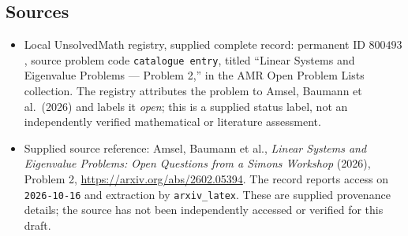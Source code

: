 \documentclass[11pt]{article}
\begin{document}
\subsection{Sources}
\begin{itemize}
\item Local UnsolvedMath registry, supplied complete record: permanent ID \(800493\), source problem code \texttt{catalogue entry}, titled ``Linear Systems and Eigenvalue Problems --- Problem 2,'' in the AMR Open Problem Lists collection. The registry attributes the problem to Amsel, Baumann et al.\ (2026) and labels it \emph{open}; this is a supplied status label, not an independently verified mathematical or literature assessment.
\item Supplied source reference: Amsel, Baumann et al., \emph{Linear Systems and Eigenvalue Problems: Open Questions from a Simons Workshop} (2026), Problem 2, \url{https://arxiv.org/abs/2602.05394}. The record reports access on \texttt{2026-10-16} and extraction by \texttt{arxiv\_latex}. These are supplied provenance details; the source has not been independently accessed or verified for this draft.
\end{itemize}
\end{document}
